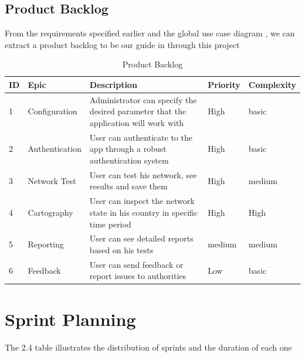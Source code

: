 \newpage


\subsection{Product Backlog}
From the requirements specified  earlier and the global use case diagram , we can extract a product backlog to be our guide in through this project 


\begin{table}[H]
\begin{tabular}{|p{0.5cm}|p{3cm}|p{7cm}|p{2cm}|p{2cm}|}
\hline
ID & Epic           & Description                                                               & Priority & Complexity \\ \hline
1  & Configuration & Administrator can specify the desired parameter that  the application will work with  & High     & basic      \\ \hline
2  & Authentication & User can authenticate to the app through a robust authentication system   & High     & basic      \\ \hline
3  & Network Test     & User can test his network, see results and save them                      & High     & medium     \\ \hline
4  & Cartography    & User can inspect the network state in his country in specific time period & High     & High       \\ \hline
5  & Reporting      & User can see detailed reports based on his tests                          & medium   & medium     \\ \hline
6  & Feedback       & User can send feedback or report issues to authorities                    & Low      & basic      \\ \hline
\end{tabular}
\caption{Product Backlog}
\label{tab:backlog}
\end{table}


\newpage

\section{Sprint Planning}

The 2.4 table illustrates the distribution of sprints and the duration of each one

